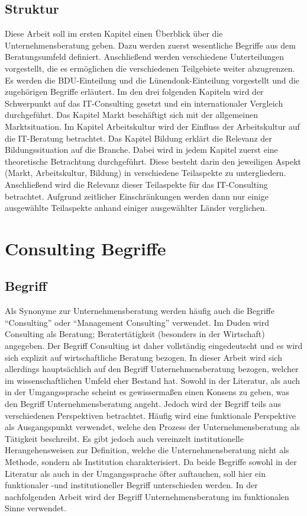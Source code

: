 \subsection*{Struktur}
Diese Arbeit soll im ersten Kapitel einen Überblick über die Unternehmensberatung geben. Dazu werden zuerst wesentliche Begriffe aus dem Beratungsumfeld definiert. Anschließend werden verschiedene Unterteilungen vorgestellt, die es ermöglichen die verschiedenen Teilgebiete weiter abzugrenzen. Es werden die BDU-Einteilung und die Lünendonk-Einteilung vorgestellt und die zugehörigen Begriffe erläutert.
Im den drei folgenden Kapiteln wird der Schwerpunkt auf das IT-Consulting gesetzt und ein internationaler Vergleich durchgeführt. Das Kapitel Markt beschäftigt sich mit der allgemeinen Marktsituation. Im Kapitel Arbeitskultur wird der Einfluss der Arbeitskultur auf die IT-Beratung betrachtet. Das Kapitel Bildung erklärt die Relevanz der Bildungssituation auf die Branche. Dabei wird in jedem Kapitel zuerst eine theoretische Betrachtung durchgeführt. Diese besteht darin den jeweiligen Aspekt (Markt, Arbeitskultur, Bildung) in verschiedene Teilaspekte zu untergliedern. Anschließend wird die Relevanz dieser Teilaspekte für das IT-Consulting betrachtet. Aufgrund zeitlicher Einschränkungen werden dann nur einige ausgewählte Teilaspekte anhand einiger ausgewählter Länder verglichen. 

\section{Consulting Begriffe}
\subsection*{Begriff}
Als Synonyme zur Unternehmensberatung werden häufig auch die Begriffe “Consulting”
oder “Management Consulting” verwendet. Im Duden wird Consulting als Beratung; Beratertätigkeit (besonders in der Wirtschaft) angegeben. Der Begriff Consulting ist daher vollständig eingedeutscht und es wird sich explizit auf wirtschaftliche Beratung bezogen. 
In dieser Arbeit wird sich allerdings hauptsächlich auf den Begriff Unternehmensberatung bezogen, welcher im wissenschaftlichen Umfeld eher Bestand hat.
Sowohl in der Literatur, als auch in der Umgangssprache scheint es gewissermaßen einen Konsens zu geben, was den Begriff Unternehmensberatung angeht. 
Jedoch wird der Begriff teils aus verschiedenen Perspektiven betrachtet. Häufig wird eine funktionale Perspektive als Ausgangspunkt verwendet, welche den Prozess der Unternehmensberatung als Tätigkeit beschreibt. Es gibt jedoch auch vereinzelt institutionelle Herangehensweisen zur Definition, welche die Unternehmensberatung nicht als Methode, sondern als Institution charakterisiert. Da beide Begriffe sowohl in der Literatur als auch in der Umgangssprache öfter auftauchen, soll hier ein funktionaler -und institutioneller Begriff unterschieden werden. In der nachfolgenden Arbeit wird der Begriff Unternehmensberatung im funktionalen Sinne verwendet.

